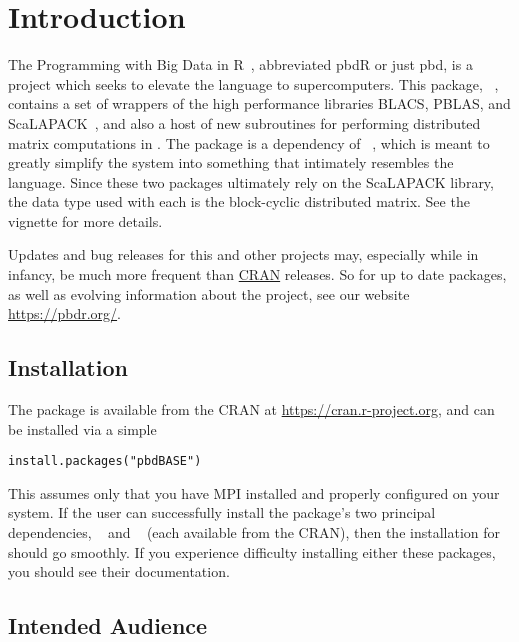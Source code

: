 \section{Introduction}
\label{sec:introduction}

The Programming with Big Data in R~\citep{pbdr2012}, abbreviated pbdR or just pbd, is a project which seeks to elevate the  language to supercomputers.  This package, ~\citep{Schmidt2012pbdBASEpackage}, contains a set of wrappers of the high performance libraries BLACS, PBLAS, and ScaLAPACK~\citep{slug}, and also a host of new subroutines for performing distributed matrix computations in .  The package is a dependency of ~\citep{Schmidt2012pbdDMATpackage}, which is meant to greatly simplify the  system into something that intimately resembles the  language.  Since these two packages ultimately rely on the ScaLAPACK library, the data type used with each is the block-cyclic distributed matrix.  See the  vignette for more details.

Updates and bug releases for this and other  projects may, especially while in infancy, be much more frequent than \href{https://cran.r-project.org/}{CRAN} releases.  So for up to date packages, as well as evolving information about the  project, see our website \href{https://pbdr.org/}{https://pbdr.org/}.


\subsection{Installation}
\label{sec:installation}

The  package is available from the CRAN at
\url{https://cran.r-project.org}, and can be installed via a simple 
\begin{lstlisting}[language=rr,title=Installing pbdBASE]
install.packages("pbdBASE")
\end{lstlisting}
This assumes only that you have MPI installed and properly configured on your system.  If the user can successfully install the package's two principal dependencies, ~\citep{Chen2012pbdMPIpackage} and ~\citep{Chen2012pbdSLAPpackage} (each available from the CRAN), then the installation for  should go smoothly.  If you experience difficulty installing either these packages, you should see their documentation.


\subsection{Intended Audience}
\label{sec:more_examples}

